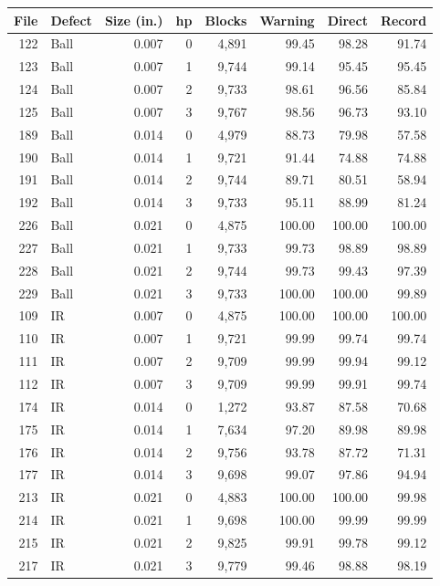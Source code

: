 \documentclass[11pt]{article}
\theoremstyle{definition}
\theoremstyle{remark}
\newcommand{\1}{\mathbf 1}
\begin{document}
\begin{table}[H]
\centering\small
\setlength{\tabcolsep}{5pt}
\begin{tabular}{rlrrrrrr}
\toprule
File & Defect & Size (in.) & hp & Blocks & Warning & Direct & Record \\
\midrule
122 & Ball & 0.007 & 0 & 4,891 & 99.45 & 98.28 & 91.74 \\
123 & Ball & 0.007 & 1 & 9,744 & 99.14 & 95.45 & 95.45 \\
124 & Ball & 0.007 & 2 & 9,733 & 98.61 & 96.56 & 85.84 \\
125 & Ball & 0.007 & 3 & 9,767 & 98.56 & 96.73 & 93.10 \\
189 & Ball & 0.014 & 0 & 4,979 & 88.73 & 79.98 & 57.58 \\
190 & Ball & 0.014 & 1 & 9,721 & 91.44 & 74.88 & 74.88 \\
191 & Ball & 0.014 & 2 & 9,744 & 89.71 & 80.51 & 58.94 \\
192 & Ball & 0.014 & 3 & 9,733 & 95.11 & 88.99 & 81.24 \\
226 & Ball & 0.021 & 0 & 4,875 & 100.00 & 100.00 & 100.00 \\
227 & Ball & 0.021 & 1 & 9,733 & 99.73 & 98.89 & 98.89 \\
228 & Ball & 0.021 & 2 & 9,744 & 99.73 & 99.43 & 97.39 \\
229 & Ball & 0.021 & 3 & 9,733 & 100.00 & 100.00 & 99.89 \\
109 & IR & 0.007 & 0 & 4,875 & 100.00 & 100.00 & 100.00 \\
110 & IR & 0.007 & 1 & 9,721 & 99.99 & 99.74 & 99.74 \\
111 & IR & 0.007 & 2 & 9,709 & 99.99 & 99.94 & 99.12 \\
112 & IR & 0.007 & 3 & 9,709 & 99.99 & 99.91 & 99.74 \\
174 & IR & 0.014 & 0 & 1,272 & 93.87 & 87.58 & 70.68 \\
175 & IR & 0.014 & 1 & 7,634 & 97.20 & 89.98 & 89.98 \\
176 & IR & 0.014 & 2 & 9,756 & 93.78 & 87.72 & 71.31 \\
177 & IR & 0.014 & 3 & 9,698 & 99.07 & 97.86 & 94.94 \\
213 & IR & 0.021 & 0 & 4,883 & 100.00 & 100.00 & 99.98 \\
214 & IR & 0.021 & 1 & 9,698 & 100.00 & 99.99 & 99.99 \\
215 & IR & 0.021 & 2 & 9,825 & 99.91 & 99.78 & 99.12 \\
217 & IR & 0.021 & 3 & 9,779 & 99.46 & 98.88 & 98.19 \\

\end{tabular}
\end{table}
\end{document}
